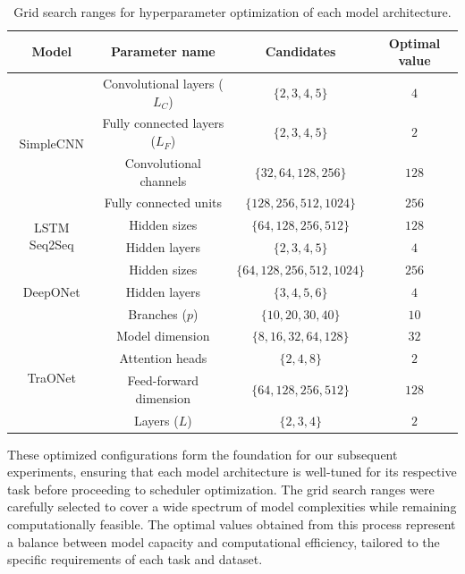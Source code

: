 \documentclass{article}
\theoremstyle{plain}
\theoremstyle{definition}
\theoremstyle{remark}
\begin{document}
\begin{table}[ht]
\caption{Grid search ranges for hyperparameter optimization of each model architecture.}
\label{tab:grid_search_ranges}
\vskip 0.1in
\begin{center}
\begin{small}
\begin{sc}
\begin{tabular}{cccc}
\toprule
\textbf{Model} & \textbf{Parameter name} & \textbf{Candidates} & \textbf{Optimal value} \\
\midrule
\multirow{4}{*}{SimpleCNN} & Convolutional layers ($L_C$) & $\{2,3,4,5\}$ & $4$ \\
& Fully connected layers ($L_F$) & $\{2,3,4,5\}$ & $2$ \\
& Convolutional channels & $\{32,64,128,256\}$ & $128$ \\
& Fully connected units & $\{128,256,512,1024\}$ & $256$ \\
\midrule
\multirow{2}{*}{LSTM Seq2Seq} & Hidden sizes & $\{64,128,256,512\}$ & $128$ \\
& Hidden layers & $\{2,3,4,5\}$ & $4$ \\
\midrule
\multirow{3}{*}{DeepONet} & Hidden sizes & $\{64,128,256,512,1024\}$ & $256$ \\
& Hidden layers & $\{3,4,5,6\}$ & $4$ \\
& Branches ($p$) & $\{10,20,30,40\}$ & $10$ \\
\midrule
\multirow{4}{*}{TraONet} & Model dimension & $\{8,16,32,64,128\}$ & $32$ \\
& Attention heads & $\{2,4,8\}$ & $2$ \\
& Feed-forward dimension & $\{64,128,256,512\}$ & $128$ \\
& Layers ($L$) & $\{2,3,4\}$ & $2$ \\
\bottomrule
\end{tabular}
\end{sc}
\end{small}
\end{center}
\vskip -0.1in
\end{table}

These optimized configurations form the foundation for our subsequent experiments, ensuring that each model architecture is well-tuned for its respective task before proceeding to scheduler optimization.
The grid search ranges were carefully selected to cover a wide spectrum of model complexities while remaining computationally feasible.
The optimal values obtained from this process represent a balance between model capacity and computational efficiency, tailored to the specific requirements of each task and dataset.
\end{document}
